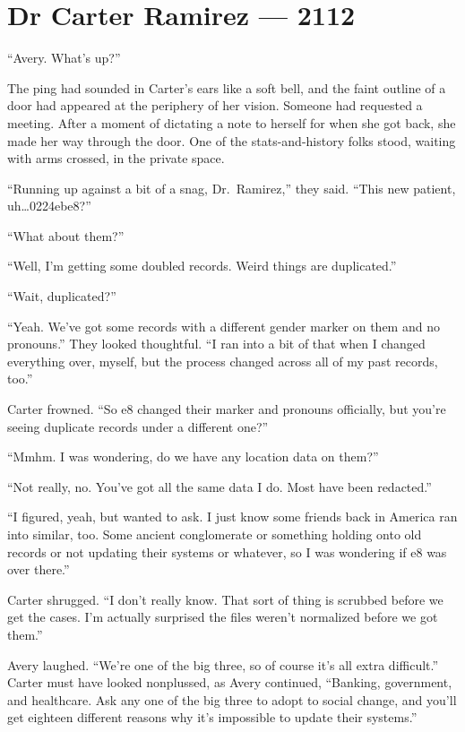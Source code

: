\hypertarget{dr-carter-ramirez-2112}{%
\chapter*{Dr Carter Ramirez — 2112}\label{dr-carter-ramirez-2112}}

``Avery. What's up?''

The ping had sounded in Carter's ears like a soft bell, and the faint outline of a door had appeared at the periphery of her vision. Someone had requested a meeting. After a moment of dictating a note to herself for when she got back, she made her way through the door. One of the stats-and-history folks stood, waiting with arms crossed, in the private space.

``Running up against a bit of a snag, Dr.~Ramirez,'' they said. ``This new patient, uh\ldots{}0224ebe8?''

``What about them?''

``Well, I'm getting some doubled records. Weird things are duplicated.''

``Wait, duplicated?''

``Yeah. We've got some records with a different gender marker on them and no pronouns.'' They looked thoughtful. ``I ran into a bit of that when I changed everything over, myself, but the process changed across all of my past records, too.''

Carter frowned. ``So e8 changed their marker and pronouns officially, but you're seeing duplicate records under a different one?''

``Mmhm. I was wondering, do we have any location data on them?''

``Not really, no. You've got all the same data I do. Most have been redacted.''

``I figured, yeah, but wanted to ask. I just know some friends back in America ran into similar, too. Some ancient conglomerate or something holding onto old records or not updating their systems or whatever, so I was wondering if e8 was over there.''

Carter shrugged. ``I don't really know. That sort of thing is scrubbed before we get the cases. I'm actually surprised the files weren't normalized before we got them.''

Avery laughed. ``We're one of the big three, so of course it's all extra difficult.'' Carter must have looked nonplussed, as Avery continued, ``Banking, government, and healthcare. Ask any one of the big three to adopt to social change, and you'll get eighteen different reasons why it's impossible to update their systems.''

